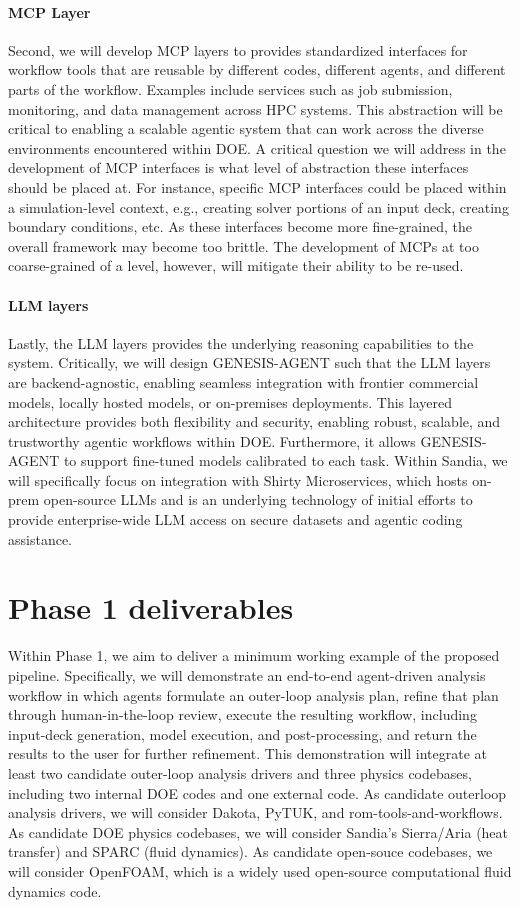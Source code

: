 \documentclass[11pt]{article} \usepackage[margin=1in]{geometry}
\begin{document}
\paragraph{MCP Layer}
Second, we will develop MCP layers to provides
standardized interfaces for workflow tools that are reusable by
different codes, different agents, and different parts of the workflow. Examples
include services such as job submission, monitoring, and data management across
HPC systems. This abstraction will be critical to enabling a scalable agentic
system that can work across the diverse environments encountered within DOE.
A critical question we will address in the development of MCP interfaces is
 what level of abstraction these interfaces should be placed at. For
instance, specific MCP interfaces could be placed within a simulation-level
context, e.g., creating solver portions of an input deck, creating boundary
conditions, etc. As these interfaces become more fine-grained, the overall
framework may become too brittle. The development of MCPs at too coarse-grained
of a level, however, will mitigate their ability to be re-used.


\paragraph{LLM layers}
Lastly, the LLM layers provides the underlying reasoning capabilities to the
system. Critically, we will design GENESIS-AGENT such that the LLM layers are backend-agnostic,
enabling seamless integration with frontier commercial models, locally hosted
models, or on-premises deployments. This layered architecture provides both
flexibility and security, enabling robust, scalable, and trustworthy agentic
workflows within DOE. Furthermore, it allows GENESIS-AGENT to support fine-tuned
models calibrated to each task. Within Sandia, we will specifically focus on integration
with Shirty Microservices, which hosts on-prem open-source LLMs and is an
underlying technology of initial efforts to provide enterprise-wide LLM access
on secure datasets and agentic
coding assistance.


\section*{Phase 1 deliverables}
Within Phase 1, we aim to deliver a minimum working example of the proposed
pipeline. Specifically, we will demonstrate an end-to-end agent-driven analysis
workflow in which agents formulate an outer-loop analysis plan, refine that plan
through human-in-the-loop review, execute the resulting workflow, including
input-deck generation, model execution, and post-processing, and return the
results to the user for further refinement. This demonstration will integrate at
least two candidate outer-loop analysis drivers and three physics codebases,
including two internal DOE codes and one external code. As candidate outerloop
analysis drivers, we will consider Dakota, PyTUK, and rom-tools-and-workflows.
As candidate DOE physics codebases, we will consider Sandia's Sierra/Aria (heat
transfer) and SPARC (fluid dynamics). As candidate open-souce codebases, we will
consider OpenFOAM, which is a widely used open-source computational fluid
dynamics code. 
\end{document}
